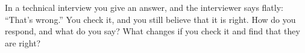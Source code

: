 \begin{question}\label{iq:iv2:behavioural-and-fit:30}
In a technical interview you give an answer, and the interviewer says flatly: ``That's wrong.'' You check it, and you still believe that it is right. How do you respond, and what do you say? What changes if you check it and find that they are right?
\end{question}
